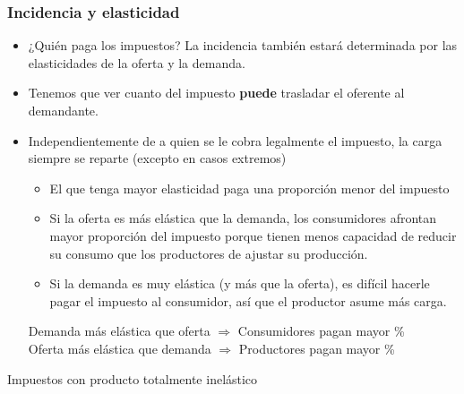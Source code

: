 \documentclass{beamer}
\begin{document}
\begin{frame}
\frametitle{Incidencia y elasticidad}
\begin{itemize}
    \item ¿Quién paga los impuestos? La incidencia también estará determinada por las elasticidades de la oferta y la demanda. 
    \item Tenemos que ver cuanto del impuesto \textbf{puede} trasladar el oferente al demandante.
    \item Independientemente de a quien se le cobra legalmente el impuesto, la carga siempre se reparte (excepto en casos extremos)
        \begin{itemize}
        \item El que tenga mayor elasticidad paga una proporción menor del impuesto
        \item Si la oferta es más elástica que la demanda, los consumidores afrontan mayor proporción del impuesto porque tienen menos capacidad de reducir su consumo que los productores de ajustar su producción.
        \item Si la demanda es muy elástica (y más que la oferta), es difícil hacerle pagar el impuesto al consumidor, así que el productor asume más carga.
        \end{itemize}
    \begin{boxB}
    \small
    \centering
    Demanda más elástica que oferta  $\Longrightarrow$ Consumidores pagan mayor \% \\
    Oferta más elástica que demanda  $\Longrightarrow$ Productores pagan mayor \%
    \end{boxB}
\end{itemize}
\end{frame}

\begin{frame}{Impuestos con producto totalmente inelástico}

\begin{figure} [H]
    \centering
{}
\end{figure} 

\end{frame}
\end{document}
